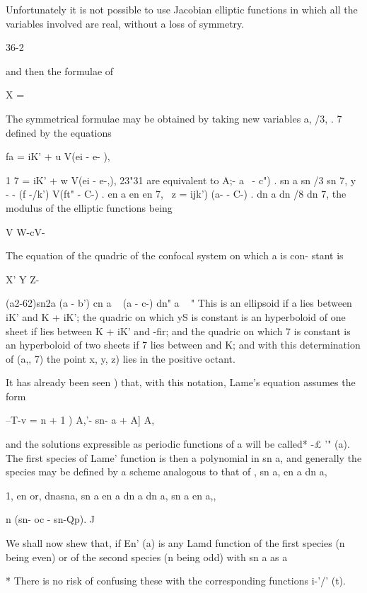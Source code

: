 {{{{{{{Unfortunately it is not possible to use Jacobian elliptic functions in
which all the variables involved are real, without a loss of symmetry.

36-2

%
%

and then the formulae of

X =

The symmetrical formulae may be obtained by taking new variables a,
/3, . 7 defined by the equations

fa = iK' + u V(ei - e- ),

1 7 = iK' + w V(ei - e-,), 23"31 are equivalent to A;- \/ a~ - c") .
sn a sn /3 sn 7, y - - (f -/k') V(ft" - C-) . en a en en 7, \ z =
ijk') \/(a- - C-) . dn a dn /8 dn 7, the modulus of the elliptic
functions being

V W-cV-

The equation of the quadric of the confocal system on which a is con-
stant is

X' Y Z-

(a2-62)sn2a (a - b') cn a ~ (a - c-) dn" a ~ " This is an ellipsoid if
a lies between iK' and K + iK'; the quadric on which yS is constant
is an hyperboloid of one sheet if lies between K + iK' and -fir; and
the quadric on which 7 is constant is an hyperboloid of two sheets if
7 lies between and K; and with this determination of (a,, 7) the
point x, y, z) lies in the positive octant.

It has already been seen ) that, with this notation, Lame's
equation assumes the form

--T-v = n + 1 ) A,'- sn- a + A] A,

and the solutions expressible as periodic functions of a will be
called* -£ '" (a). The first species of Lame' function is then a
polynomial in sn a, and generally the species may be defined by a
scheme analogous to that of , sn a, en a dn a,

1, en or, dnasna, sn a en a dn a dn a, sn a en a,,

n (sn- oc - sn-Qp). J


We shall now shew that, if En' (a) is any Lamd function of the first
species (n being even) or of the second species (n being odd) with sn
a as a

* There is no risk of confusing these with the corresponding functions
i-'/' (t).

}}}}}}}
